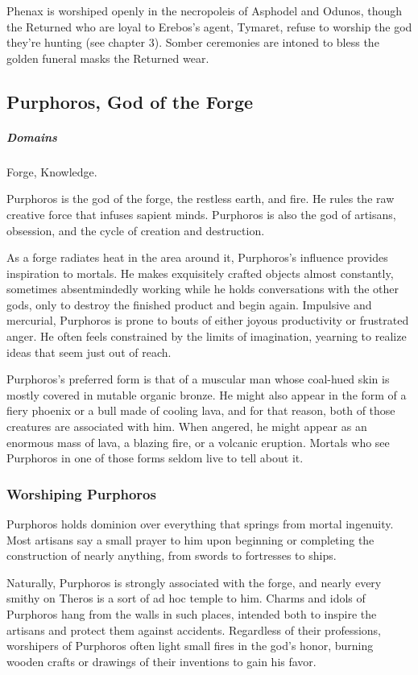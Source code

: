         Phenax is worshiped openly in the necropoleis of Asphodel and Odunos, though the Returned who are loyal to Erebos's agent, Tymaret, refuse to worship the god they're hunting (see chapter 3). Somber ceremonies are intoned to bless the golden funeral masks the Returned wear.

\subsection*{Purphoros, God of the Forge} \label{ssec::purphoros}
    \subparagraph{Domains} Forge, Knowledge.

    Purphoros is the god of the forge, the restless earth, and fire. He rules the raw creative force that infuses sapient minds. Purphoros is also the god of artisans, obsession, and the cycle of creation and destruction.

    As a forge radiates heat in the area around it, Purphoros's influence provides inspiration to mortals. He makes exquisitely crafted objects almost constantly, sometimes absentmindedly working while he holds conversations with the other gods, only to destroy the finished product and begin again. Impulsive and mercurial, Purphoros is prone to bouts of either joyous productivity or frustrated anger. He often feels constrained by the limits of imagination, yearning to realize ideas that seem just out of reach.

    Purphoros's preferred form is that of a muscular man whose coal-hued skin is mostly covered in mutable organic bronze. He might also appear in the form of a fiery phoenix or a bull made of cooling lava, and for that reason, both of those creatures are associated with him. When angered, he might appear as an enormous mass of lava, a blazing fire, or a volcanic eruption. Mortals who see Purphoros in one of those forms seldom live to tell about it.

    \subsubsection{Worshiping Purphoros}
        Purphoros holds dominion over everything that springs from mortal ingenuity. Most artisans say a small prayer to him upon beginning or completing the construction of nearly anything, from swords to fortresses to ships.

        Naturally, Purphoros is strongly associated with the forge, and nearly every smithy on Theros is a sort of ad hoc temple to him. Charms and idols of Purphoros hang from the walls in such places, intended both to inspire the artisans and protect them against accidents. Regardless of their professions, worshipers of Purphoros often light small fires in the god's honor, burning wooden crafts or drawings of their inventions to gain his favor.

